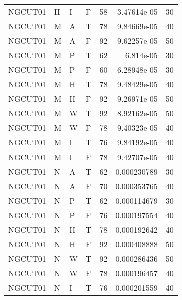 \begin{longtable}{llllrrr}
    NGCUT01  & H         & I         & F          & 58         & 3.47614e-05 & 30       \\
    NGCUT01  & M         & A         & T          & 78         & 9.84669e-05 & 40       \\
    NGCUT01  & M         & A         & F          & 92         & 9.62257e-05 & 50       \\
    NGCUT01  & M         & P         & T          & 62         & 6.814e-05   & 30       \\
    NGCUT01  & M         & P         & F          & 60         & 6.28948e-05 & 30       \\
    NGCUT01  & M         & H         & T          & 78         & 9.48429e-05 & 40       \\
    NGCUT01  & M         & H         & F          & 92         & 9.26971e-05 & 50       \\
    NGCUT01  & M         & W         & T          & 92         & 8.92162e-05 & 50       \\
    NGCUT01  & M         & W         & F          & 78         & 9.40323e-05 & 40       \\
    NGCUT01  & M         & I         & T          & 76         & 9.84192e-05 & 40       \\
    NGCUT01  & M         & I         & F          & 78         & 9.42707e-05 & 40       \\
    NGCUT01  & N         & A         & T          & 62         & 0.000230789 & 30       \\
    NGCUT01  & N         & A         & F          & 70         & 0.000353765 & 40       \\
    NGCUT01  & N         & P         & T          & 62         & 0.000114679 & 30       \\
    NGCUT01  & N         & P         & F          & 76         & 0.000197554 & 40       \\
    NGCUT01  & N         & H         & T          & 78         & 0.000192642 & 40       \\
    NGCUT01  & N         & H         & F          & 92         & 0.000408888 & 50       \\
    NGCUT01  & N         & W         & T          & 92         & 0.000286436 & 50       \\
    NGCUT01  & N         & W         & F          & 78         & 0.000196457 & 40       \\
    NGCUT01  & N         & I         & T          & 76         & 0.000201559 & 40       \\

\end{longtable}
